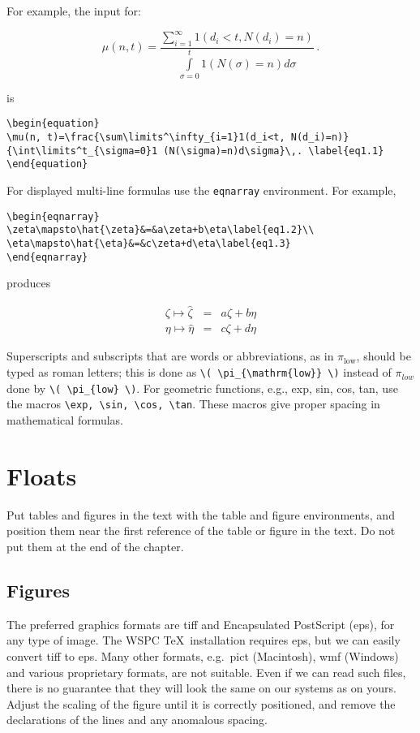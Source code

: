For example, the input for:

\begin{equation}
\mu(n, t) = \frac{\sum\limits^\infty_{i=1}1 (d_i < t, N(d_i) = n)}
{\int\limits^t_{\sigma=0}1(N(\sigma)=n)d\sigma}\,. \label{eq1.1}
\end{equation}

\noindent is

\begin{verbatim}
\begin{equation}
\mu(n, t)=\frac{\sum\limits^\infty_{i=1}1(d_i<t, N(d_i)=n)}
{\int\limits^t_{\sigma=0}1 (N(\sigma)=n)d\sigma}\,. \label{eq1.1}
\end{equation}
\end{verbatim}

For displayed multi-line formulas use the \verb|eqnarray| environment. For
example,

\begin{verbatim}
\begin{eqnarray}
\zeta\mapsto\hat{\zeta}&=&a\zeta+b\eta\label{eq1.2}\\
\eta\mapsto\hat{\eta}&=&c\zeta+d\eta\label{eq1.3}
\end{eqnarray}
\end{verbatim}

\noindent produces

\noindent\begin{eqnarray}
\zeta\mapsto\hat{\zeta}&=&a\zeta+b\eta\label{eq1.2}\\
\eta\mapsto\hat{\eta}&=&c\zeta+d\eta\label{eq1.3}
\end{eqnarray}

Superscripts and subscripts that are words or abbreviations, as in
\( \pi_{\mathrm{low}} \), should be typed as roman letters; this is
done as \verb|\( \pi_{\mathrm{low}} \)| instead of \( \pi_{low} \)
done by \verb|\( \pi_{low} \)|.
For geometric functions, e.g., exp, sin, cos, tan, use
the macros \verb|\exp, \sin, \cos, \tan|. These macros give proper
spacing in mathematical formulas.

\section{Floats}
Put tables and figures in the text with the table and figure
environments, and position them near the first reference of the
table or figure in the text. Do not put them at the end of the
chapter.

\subsection{Figures}
The preferred graphics formats are tiff and Encapsulated PostScript
(eps), for any type of image. The WSPC \TeX\ installation requires
eps, but we can easily convert tiff to eps. Many other formats,
e.g.~pict (Macintosh), wmf (Windows) and various proprietary
formats, are not suitable. Even if we can read such files, there is
no guarantee that they will look the same on our systems as on
yours. Adjust the scaling of the figure until it is correctly
positioned, and remove the declarations of the lines and any
anomalous spacing.


